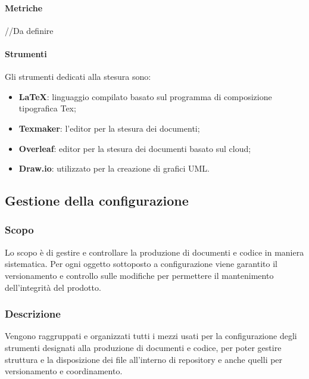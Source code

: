\paragraph{Metriche}
//Da definire

\paragraph{Strumenti}
Gli strumenti dedicati alla stesura sono:
\begin{itemize}
\item \textbf{\LaTeX}: linguaggio compilato basato sul programma di composizione tipografica Tex;
\item \textbf{Texmaker}: l’editor per la stesura dei documenti;
\item \textbf{Overleaf}: editor per la stesura dei documenti basato sul cloud;
\item \textbf{Draw.io}: utilizzato per la creazione di grafici UML. 
\end{itemize}

\subsection{Gestione della configurazione}
\subsubsection{Scopo}
Lo scopo è di gestire e controllare la produzione di documenti e codice in maniera sistematica. Per ogni oggetto sottoposto a configurazione viene garantito il versionamento e controllo sulle modifiche per permettere il mantenimento dell'integrità del prodotto. 

\subsubsection{Descrizione}
Vengono raggruppati e organizzati tutti i mezzi usati per la configurazione degli strumenti designati alla produzione di documenti e codice, per poter gestire struttura e la disposizione dei file all’interno di repository e anche  quelli per versionamento e coordinamento.

